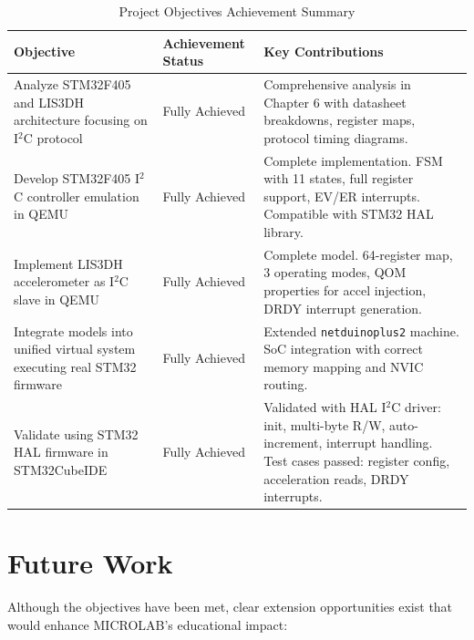 \begin{table}[H]
  \centering
  
  \begin{tabularx}{\textwidth}{|>{\raggedright\arraybackslash}p{6cm}|l|>{\raggedright\arraybackslash}X|}
    \hline
    \textbf{Objective} & \textbf{Achievement Status} & \textbf{Key Contributions} \\
    \hline
    Analyze STM32F405 and LIS3DH architecture focusing on I$^2$C protocol & 
    Fully Achieved   & 
    Comprehensive analysis in Chapter 6 with datasheet breakdowns, register maps, protocol timing diagrams. \\
    \hline
    Develop STM32F405 I$^2$C controller emulation in QEMU & 
    Fully Achieved   & 
    Complete implementation. FSM with 11 states, full register support, EV/ER interrupts. Compatible with STM32 HAL library. \\
    \hline
    Implement LIS3DH accelerometer as I$^2$C slave in QEMU & 
    Fully Achieved   & 
    Complete model. 64-register map, 3 operating modes, QOM properties for accel injection, DRDY interrupt generation. \\
    \hline
    Integrate models into unified virtual system executing real STM32 firmware & 
    Fully Achieved   & 
    Extended \texttt{netduinoplus2} machine. SoC integration with correct memory mapping and NVIC routing. \\
    \hline
    Validate using STM32 HAL firmware in STM32CubeIDE & 
    Fully Achieved   & 
    Validated with HAL I$^2$C driver: init, multi-byte R/W, auto-increment, interrupt handling. Test cases passed: register config, acceleration reads, DRDY interrupts. \\
    \hline
  \end{tabularx}
  \caption{Project Objectives Achievement Summary}
  \label{tab:objetivos}
\end{table}

\newpage
\section{Future Work}

Although the objectives have been met, clear extension opportunities exist that would 
enhance MICROLAB's educational impact:

